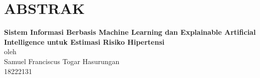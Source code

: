 \chapter*{ABSTRAK}

\begin{center}

    \textbf{Sistem Informasi Berbasis Machine Learning dan Explainable Artificial Intelligence untuk Estimasi Risiko Hipertensi} \\
    \vspace{0.4cm}
    oleh \\
    \vspace{0.4cm}
    Samuel Franciscus Togar Hasurungan\\
    18222131\\
\end{center}


